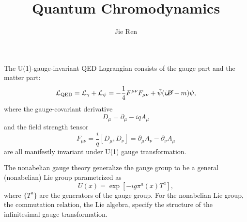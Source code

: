 \documentclass[aps,prb,superscriptaddress,nofootinbib]{revtex4}
\begin{document}
\title{Quantum Chromodynamics}
\author{Jie Ren}



\maketitle


The U(1)-gauge-invariant QED Lagrangian consists of the gauge part and the matter part:
\begin{equation}
	\mathcal L_{\mathrm{QED}} = \mathcal L_\gamma + \mathcal L_\psi 
	= -\frac{1}{4} F^{\mu\nu} F_{\mu\nu} + \bar\psi(i\cancel D-m)\psi,
\end{equation}
where the gauge-covariant derivative 
\begin{equation}
	D_\mu = \partial_\mu - iq A_\mu
\end{equation}
and the field strength tensor
\begin{equation}
	F_{\mu\nu} = \frac{i}{q} [D_\mu, D_\nu] = \partial_\mu A_\nu -\partial_\nu A_\mu
\end{equation}
are all manifestly invariant under U(1) gauge transformation.

The nonabelian gauge theory generalize the gauge group to be a general (nonabelian) Lie group parametrized as
\begin{equation}
	U(x) = \exp\left[-i g \pi^a(x) T^a\right],
\end{equation}
where $\{T^a\}$ are the generators of the gauge group.
For the nonabelian Lie group, the commutation relation, the Lie algebra, specify the structure of the infinitesimal gauge transformation.


\tableofcontents
\end{document}
